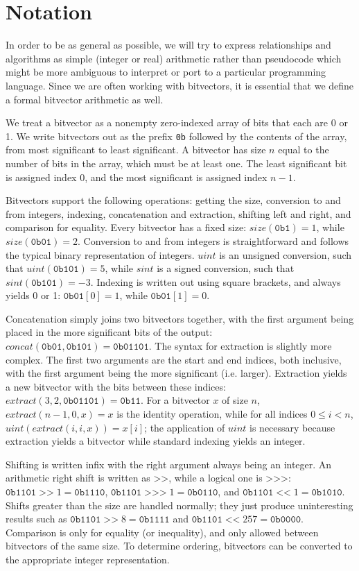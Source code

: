 \documentclass[letterpaper,10pt]{article}
\begin{document}
\section{Notation}

In order to be as general as possible, we will try to express relationships and algorithms as simple (integer or real) arithmetic rather than pseudocode which might be more ambiguous to interpret or port to a particular programming language. Since we are often working with bitvectors, it is essential that we define a formal bitvector arithmetic as well.

We treat a bitvector as a nonempty zero-indexed array of bits that each are 0 or 1. We write bitvectors out as the prefix \texttt{0b} followed by the contents of the array, from most significant to least significant. A bitvector has size $n$ equal to the number of bits in the array, which must be at least one. The least significant bit is assigned index 0, and the most significant is assigned index $n-1$.

Bitvectors support the following operations: getting the size, conversion to and from integers, indexing, concatenation and extraction, shifting left and right, and comparison for equality. Every bitvector has a fixed size: $size(\texttt{0b1}) = 1$, while $size(\texttt{0b01}) = 2$. Conversion to and from integers is straightforward and follows the typical binary representation of integers. $uint$ is an unsigned conversion, such that $uint(\texttt{0b101}) = 5$, while $sint$ is a signed conversion, such that $sint(\texttt{0b101}) = -3$. Indexing is written out using square brackets, and always yields 0 or 1: $\texttt{0b01}[0] = 1$, while $\texttt{0b01}[1] = 0$.

Concatenation simply joins two bitvectors together, with the first argument being placed in the more significant bits of the output: $concat(\texttt{0b01}, \texttt{0b101}) = \texttt{0b01101}$. The syntax for extraction is slightly more complex. The first two arguments are the start and end indices, both inclusive, with the first argument being the more significant (i.e. larger). Extraction yields a new bitvector with the bits between these indices: $extract(3, 2, \texttt{0b01101}) = \texttt{0b11}$. For a bitvector $x$ of size $n$, $extract(n-1, 0, x) = x$ is the identity operation, while for all indices $0 \leq i < n$, $uint(extract(i, i, x)) = x[i]$; the application of $uint$ is necessary because extraction yields a bitvector while standard indexing yields an integer.

Shifting is written infix with the right argument always being an integer. An arithmetic right shift is written as $\texttt{>>}$, while a logical one is $\texttt{>>>}$: $\texttt{0b1101} \;\texttt{>>}\; 1 = \texttt{0b1110}$, $\texttt{0b1101} \;\texttt{>>>}\; 1 = \texttt{0b0110}$, and $\texttt{0b1101} \;\texttt{<<}\; 1 = \texttt{0b1010}$. Shifts greater than the size are handled normally; they just produce uninteresting results such as $\texttt{0b1101} \;\texttt{>>}\; 8 = \texttt{0b1111}$ and $\texttt{0b1101} \;\texttt{<<}\; 257 = \texttt{0b0000}$. Comparison is only for equality (or inequality), and only allowed between bitvectors of the same size. To determine ordering, bitvectors can be converted to the appropriate integer representation.
\end{document}
